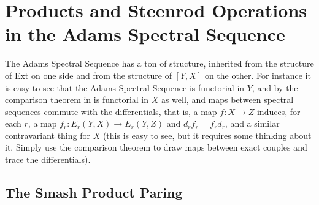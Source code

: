 \section{Products and Steenrod Operations in the Adams Spectral Sequence}

The Adams Spectral Sequence has a ton of structure, inherited from the structure of Ext on one side and from the structure of $[Y,X]$ on the other.
For instance it is easy to see that the Adams Spectral Sequence is functorial in $Y$, and by the comparison theorem in is functorial in $X$ as well,
and maps between spectral sequences commute with the differentials, that is, a map $f:X\to Z$ induces, for each $r$, a map $f_r :E_r(Y,X)\to E_r(Y,Z)$ and $d_rf_r=f_rd_r$, and a similar contravariant thing for $X$ (this is easy to see, but it requires some thinking about it.  Simply use the comparison theorem to draw maps between exact couples and trace the differentials).  

\subsection{The Smash Product Paring}

